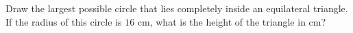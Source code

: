 Draw the largest possible circle that lies completely inside an equilateral triangle. If the radius of this circle is $16$ cm, what is the height of the triangle in cm?
